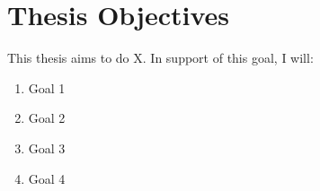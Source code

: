 
\section{Thesis Objectives}

This thesis aims to do X. In support of this goal, I will:

\begin{enumerate}
    \item Goal 1
    \item Goal 2
    \item Goal 3
    \item Goal 4
\end{enumerate}
